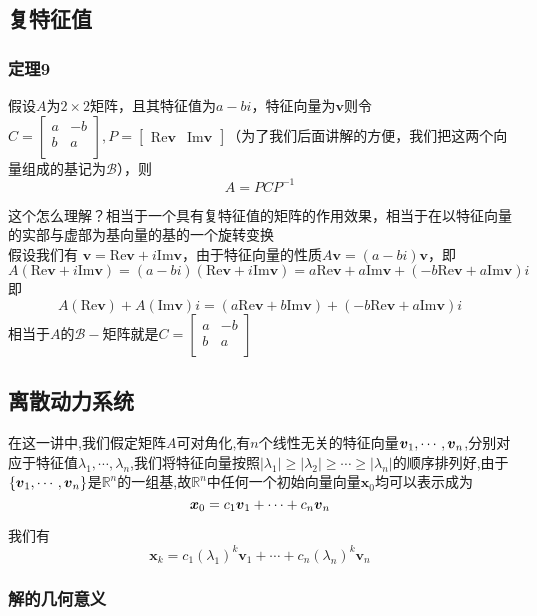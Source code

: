 \documentclass{article}
\newcommand{\RR}{\mathbb{R}}
\newcommand{\ve}{\boldsymbol}
\newcommand{\base}{\mathcal}
\begin{document}
\begin{CJK}{UTF8}{gkai}
\subsection{复特征值}


\subsubsection{定理9}
假设$A$为$2\times 2$矩阵，且其特征值为$a - b i $，特征向量为$\ve{v}$则令$C = \begin{bmatrix} a& -b\\b &a \\\end{bmatrix},P = \begin{bmatrix} \text{Re} \ve{v} & \text{Im} \ve{v} \end{bmatrix}$（为了我们后面讲解的方便，我们把这两个向量组成的基记为$\base{B}$），则
\[ A = P C P^{-1}\]

这个怎么理解？相当于一个具有复特征值的矩阵的作用效果，相当于在以特征向量的实部与虚部为基向量的基的一个旋转变换\\

假设我们有 $\ve{v} = \text{Re} \ve{v} +  i \text{Im} \ve{v} $，由于特征向量的性质$A \ve{v} = (a - bi) \ve{v}$，即$A (\text{Re} \ve{v} + i\text{Im} \ve{v} ) = (a - bi)(\text{Re} \ve{v} + i\text{Im} \ve{v} ) = a \text{Re}\ve{v} + a \text{Im}\ve{v} +(-b \text{Re}\ve{v} +a \text{Im}\ve{v})i$
即\[A (\text{Re} \ve{v}) + A(\text{Im} \ve{v} )i =  (a \text{Re}\ve{v} + b \text{Im}\ve{v}) +(-b \text{Re}\ve{v} +a \text{Im}\ve{v})i\]
相当于$A$的$\base{B}-$矩阵就是$C = \begin{bmatrix} a &-b\\b& a\\\end{bmatrix}$\\
\subsection{离散动力系统}
在这一讲中,我们假定矩阵$A$可对角化,有$n$个线性无关的特征向量$\vs{v}{1}{n}$,分别对应于特征值$\lambda_1,\cdots,\lambda_n$,我们将特征向量按照$|\lambda_1|\geq|\lambda_2|\geq\cdots\geq|\lambda_n|$的顺序排列好,由于$\{\vs{v}{1}{n}\}$是$\RR^n$的一组基,故$\RR^n$中任何一个初始向量向量$\ve{x}_0$均可以表示成为\\
\[\ve{x}_0 = \cvs{c}{v}{+}{1}{n}\]

我们有
\[\ve{x}_k = c_1 (\lambda_1)^k \ve{v}_1 + \cdots + c_n (\lambda_n)^k \ve{v}_n\]
\subsubsection{解的几何意义}

\end{CJK}
\end{document}
